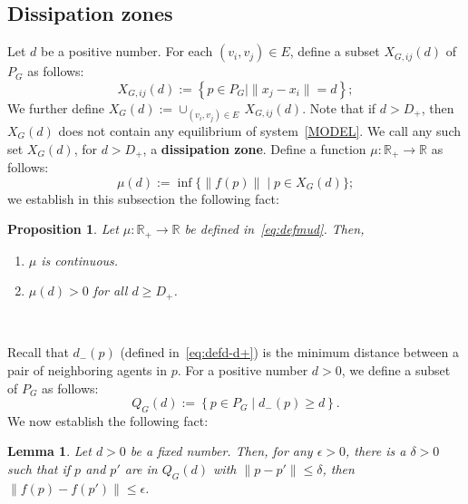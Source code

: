 \documentclass[10pt,twocolumn,twoside]{IEEEtran}
\newtheorem{pro}{Proposition}
\newtheorem{lem}{Lemma}
\newcommand{\R}{\mathbb{R}}
\renewcommand{\(}{\left (}
\renewcommand{\)}{\right )}
\renewcommand{\;}{\,;\,}
\begin{document}
\subsection{Dissipation zones}\label{ssec:dz}
Let $d$ be a positive number. For each $(v_i,v_j) \in E$, 
define a subset $X_{G,ij}(d)$ of $P_G$ as follows:
\begin{equation}\label{eq:defXGijd}
X_{G,ij}(d) :=\left  \{ p\in P_G  \mid  \|x_j - x_i\| = d \right \}; 
\end{equation}
We further define
$X_{G}(d):= \cup_{(v_i,v_j) \in E}\,  X_{G,ij}(d)$. 
Note that if $d > D_+$, then $X_{G}(d)$ does not contain any equilibrium of system~\eqref{MODEL}. We call any such set $X_{G}(d)$, for $d > D_+$, a {\bf dissipation zone}. 
Define a function $\mu:\R_+\longrightarrow \R$ as follows:
\begin{equation}\label{eq:defmud}
\mu(d) := \inf\{\|f(p)\| \mid p\in X_{G}(d) \};
\end{equation}
we establish in this subsection the following fact:

\begin{pro}\label{pro:defnud}
Let $\mu:\R_+ \longrightarrow \R$ be defined in~\eqref{eq:defmud}. Then, 
\begin{enumerate}
\item $\mu$ is continuous. 
\item $\mu(d) > 0$ for all $d \ge D_+$.  
\end{enumerate}\,
\end{pro}




Recall that $d_-(p)$ (defined in~\eqref{eq:defd-d+}) is the minimum distance between a pair of neighboring agents in $p$. For a positive number $d > 0$, we define a subset of $P_G$ as follows: \begin{equation}\label{eq:defQd}
Q_G(d):= \left\{ p\in P_G \mid d_-(p) \ge d  \right \}.
\end{equation}
We now establish the following fact:

\begin{lem}\label{lem:evaluatedifferenceoftwovectorfields}
Let $d> 0$ be a fixed number. Then,  for any $\epsilon > 0$, there is a $\delta > 0$ such that if $p$ and $p'$ are in $Q_G(d)$ with $\|p - p'\| \le \delta$, 
then   
$\|f(p) - f(p')\| \le \epsilon$. 
\end{lem}
\end{document}
